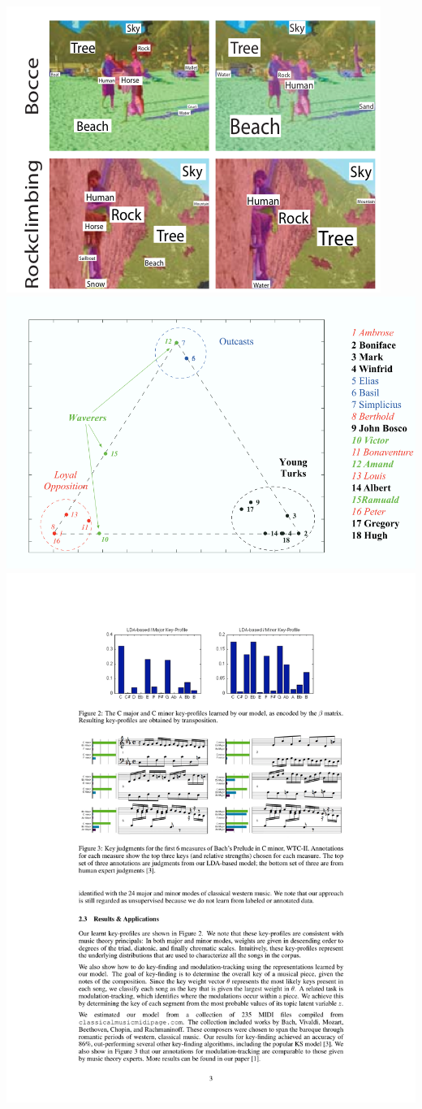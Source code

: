 \documentclass[compress]{beamer}
\begin{document}
\begin{frame}
\begin{columns}
\begin{center}
\includegraphics[width=0.7\linewidth]{topic_models/feifei} \\
\includegraphics[width=0.7\linewidth]{topic_models/socialnetworks} \\
\includegraphics[width=0.7\linewidth]{topic_models/hu}
\end{center}
\end{columns}
\end{frame}
\end{document}
